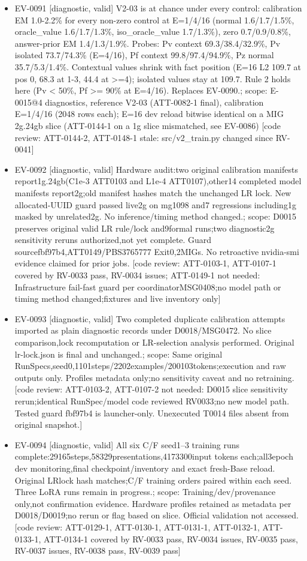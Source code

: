 \documentclass[11pt]{article}
\begin{document}
\begin{itemize}
\item EV-0091 [diagnostic, valid] V2-03 is at chance under every control: calibration EM 1.0-2.2\% for every non-zero control at E=1/4/16 (normal 1.6/1.7/1.5\%, oracle\_value 1.6/1.7/1.3\%, iso\_oracle\_value 1.7/1.3\%), zero 0.7/0.9/0.8\%, answer-prior EM 1.4/1.3/1.9\%. Probes: Pv context 69.3/38.4/32.9\%, Pv isolated 73.7/74.3\% (E=4/16), Pf context 99.8/97.4/94.9\%, Pz normal 35.7/5.3/1.4\%. Contextual values shrink with fact position (E=16 L2 109.7 at pos 0, 68.3 at 1-3, 44.4 at \textgreater{}=4); isolated values stay at 109.7. Rule 2 holds here (Pv \textless{} 50\%, Pf \textgreater{}= 90\% at E=4/16). Replaces EV-0090.; scope: E-0015@4 diagnostics, reference V2-03 (ATT-0082-1 final), calibration E=1/4/16 (2048 rows each); E=16 dev reload bitwise identical on a MIG 2g.24gb slice (ATT-0144-1 on a 1g slice mismatched, see EV-0086) [code review: ATT-0144-2, ATT-0148-1 stale: src/v2\_train.py changed since RV-0041]
\item EV-0092 [diagnostic, valid] Hardware audit:two original calibration manifests report1g.24gb(C1e-3 ATT0103 and L1e-4 ATT0107),other14 completed model manifests report2g;old manifest hashes match the unchanged LR lock. New allocated-UUID guard passed live2g on mg1098 and7 regressions including1g masked by unrelated2g. No inference/timing method changed.; scope: D0015 preserves original valid LR rule/lock and9formal runs;two diagnostic2g sensitivity reruns authorized,not yet complete. Guard sourcefbf97b4,ATT0149/PBS3765777 Exit0,2MIGs. No retroactive nvidia-smi evidence claimed for prior jobs. [code review: ATT-0103-1, ATT-0107-1 covered by RV-0033 pass, RV-0034 issues; ATT-0149-1 not needed: Infrastructure fail-fast guard per coordinatorMSG0408;no model path or timing method changed;fixtures and live inventory only]
\item EV-0093 [diagnostic, valid] Two completed duplicate calibration attempts imported as plain diagnostic records under D0018/MSG0472. No slice comparison,lock recomputation or LR-selection analysis performed. Original lr-lock.json is final and unchanged.; scope: Same original RunSpecs,seed0,1101steps/2202examples/200103tokens;execution and raw outputs only. Profiles metadata only;no sensitivity caveat and no retraining. [code review: ATT-0103-2, ATT-0107-2 not needed: D0015 slice sensitivity rerun;identical RunSpec/model code reviewed RV0033;no new model path. Tested guard fbf97b4 is launcher-only. Unexecuted T0014 files absent from original snapshot.]
\item EV-0094 [diagnostic, valid] All six C/F seed1--3 training runs complete:29165steps,58329presentations,4173300input tokens each;all3epoch dev monitoring,final checkpoint/inventory and exact fresh-Base reload. Original LRlock hash matches;C/F training orders paired within each seed. Three LoRA runs remain in progress.; scope: Training/dev/provenance only,not confirmation evidence. Hardware profiles retained as metadata per D0018/D0019;no rerun or flag based on slice. Official validation not accessed. [code review: ATT-0129-1, ATT-0130-1, ATT-0131-1, ATT-0132-1, ATT-0133-1, ATT-0134-1 covered by RV-0033 pass, RV-0034 issues, RV-0035 pass, RV-0037 issues, RV-0038 pass, RV-0039 pass]

\end{itemize}
\end{document}
